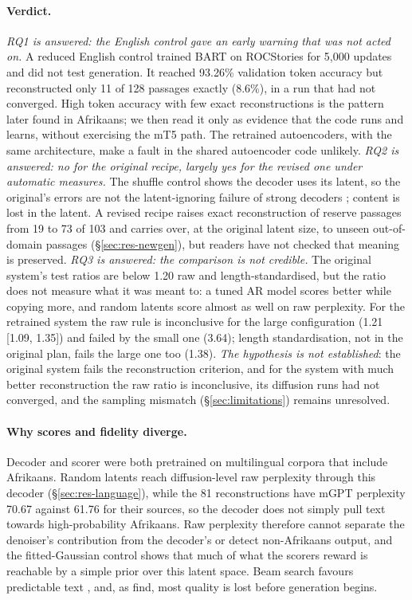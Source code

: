 \documentclass[11pt,a4paper]{article}
\begin{document}
\paragraph{Verdict.} \emph{RQ1 is answered: the English control gave an early warning that was not acted on.} A reduced English control trained BART \citep{lewis2020bart} on ROCStories \citep{mostafazadeh2016corpus} for 5,000 updates and did not test generation. It reached 93.26\% validation token accuracy but reconstructed only 11 of 128 passages exactly (8.6\%), in a run that had not converged. High token accuracy with few exact reconstructions is the pattern later found in Afrikaans; we then read it only as evidence that the code runs and learns, without exercising the mT5 path. The retrained autoencoders, with the same architecture, make a fault in the shared autoencoder code unlikely. \emph{RQ2 is answered: no for the original recipe, largely yes for the revised one under automatic measures.} The shuffle control shows the decoder uses its latent, so the original's errors are not the latent-ignoring failure of strong decoders \citep{bowman2016generating,li2020optimus}; content is lost in the latent. A revised recipe raises exact reconstruction of reserve passages from 19 to 73 of 103 and carries over, at the original latent size, to unseen out-of-domain passages (\S\ref{sec:res-newgen}), but readers have not checked that meaning is preserved. \emph{RQ3 is answered: the comparison is not credible.} The original system's test ratios are below 1.20 raw and length-standardised, but the ratio does not measure what it was meant to: a tuned AR model scores better while copying more, and random latents score almost as well on raw perplexity. For the retrained system the raw rule is inconclusive for the large configuration (1.21 [1.09, 1.35]) and failed by the small one (3.64); length standardisation, not in the original plan, fails the large one too (1.38). \emph{The hypothesis is not established}: the original system fails the reconstruction criterion, and for the system with much better reconstruction the raw ratio is inconclusive, its diffusion runs had not converged, and the sampling mismatch (\S\ref{sec:limitations}) remains unresolved.

\paragraph{Why scores and fidelity diverge.} Decoder and scorer were both pretrained on multilingual corpora that include Afrikaans. Random latents reach diffusion-level raw perplexity through this decoder (\S\ref{sec:res-language}), while the 81 reconstructions have mGPT perplexity 70.67 against 61.76 for their sources, so the decoder does not simply pull text towards high-probability Afrikaans. Raw perplexity therefore cannot separate the denoiser's contribution from the decoder's or detect non-Afrikaans output, and the fitted-Gaussian control shows that much of what the scorers reward is reachable by a simple prior over this latent space. Beam search favours predictable text \citep{holtzman2020curious,meister2020beam}, and, as \citet{gavrilov2026where} find, most quality is lost before generation begins.
\end{document}
